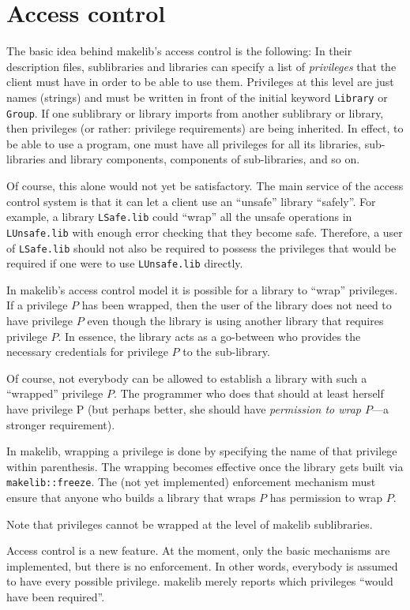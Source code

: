 
\section{Access control}
\label{sec:access}

The basic idea behind makelib's access control is the following: In their
description files, sublibraries and libraries can specify a list of
{\em privileges} that the client must have in order to be able to use them.
Privileges at this level are just names (strings) and must be written
in front of the initial keyword {\tt Library} or {\tt Group}.  If one
sublibrary or library imports from another sublibrary or library, then
privileges (or rather: privilege requirements) are being inherited.
In effect, to be able to use a program, one must have all privileges
for all its libraries, sub-libraries and library components,
components of sub-libraries, and so on.

Of course, this alone would not yet be satisfactory.  The main service
of the access control system is that it can let a client use an
``unsafe'' library ``safely''.  For example, a library {\tt LSafe.lib}
could ``wrap'' all the unsafe operations in {\tt LUnsafe.lib} with
enough error checking that they become safe.  Therefore, a user of
{\tt LSafe.lib} should not also be required to possess the privileges
that would be required if one were to use {\tt LUnsafe.lib} directly.

In makelib's access control model it is possible for a library to ``wrap''
privileges.  If a privilege $P$ has been wrapped, then the user of the
library does not need to have privilege $P$ even though the library is
using another library that requires privilege $P$.  In essence, the
library acts as a go-between who provides the necessary credentials
for privilege $P$ to the sub-library.

Of course, not everybody can be allowed to establish a library with
such a ``wrapped'' privilege $P$.  The programmer who does that should at
least herself have privilege P (but perhaps better, she should have
{\em permission to wrap $P$}---a stronger requirement).

In makelib, wrapping a privilege is done by specifying the name of that
privilege within parenthesis.  The wrapping becomes effective once the
library gets built via {\tt makelib::freeze}.  The (not yet
implemented) enforcement mechanism must ensure that anyone who
builds a library that wraps $P$ has permission to wrap $P$.

Note that privileges cannot be wrapped at the level of makelib sublibraries.

Access control is a new feature. At the moment, only the basic
mechanisms are implemented, but there is no enforcement.  In other
words, everybody is assumed to have every possible privilege.  makelib
merely reports which privileges ``would have been required''.
